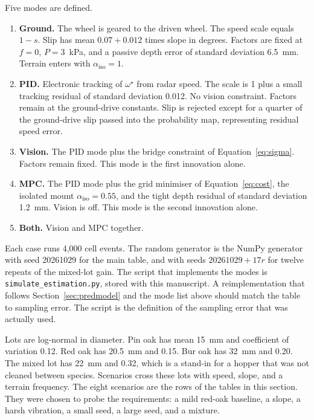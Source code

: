 Five modes are defined.

\begin{enumerate}
\item \textbf{Ground.} The wheel is geared to the driven wheel. The speed scale equals $1-s$. Slip has mean $0.07+0.012$ times slope in degrees. Factors are fixed at $f=0$, $P=3$~kPa, and a passive depth error of standard deviation 6.5~mm. Terrain enters with $\alpha_{\mathrm{iso}}=1$.
\item \textbf{PID.} Electronic tracking of $\omega^{\star}$ from radar speed. The scale is 1 plus a small tracking residual of standard deviation 0.012. No vision constraint. Factors remain at the ground-drive constants. Slip is rejected except for a quarter of the ground-drive slip passed into the probability map, representing residual speed error.
\item \textbf{Vision.} The PID mode plus the bridge constraint of Equation~\eqref{eq:sigma}. Factors remain fixed. This mode is the first innovation alone.
\item \textbf{MPC.} The PID mode plus the grid minimiser of Equation~\eqref{eq:cost}, the isolated mount $\alpha_{\mathrm{iso}}=0.55$, and the tight depth residual of standard deviation 1.2~mm. Vision is off. This mode is the second innovation alone.
\item \textbf{Both.} Vision and MPC together.
\end{enumerate}

Each case runs 4{,}000 cell events. The random generator is the NumPy generator with seed 20261029 for the main table, and with seeds $20261029+17r$ for twelve repeats of the mixed-lot gain. The script that implements the modes is \texttt{simulate\_estimation.py}, stored with this manuscript. A reimplementation that follows Section~\ref{sec:predmodel} and the mode list above should match the table to sampling error. The script is the definition of the sampling error that was actually used.

Lots are log-normal in diameter. Pin oak has mean 15~mm and coefficient of variation 0.12. Red oak has 20.5~mm and 0.15. Bur oak has 32~mm and 0.20. The mixed lot has 22~mm and 0.32, which is a stand-in for a hopper that was not cleaned between species. Scenarios cross these lots with speed, slope, and a terrain frequency. The eight scenarios are the rows of the tables in this section. They were chosen to probe the requirements: a mild red-oak baseline, a slope, a harsh vibration, a small seed, a large seed, and a mixture.

